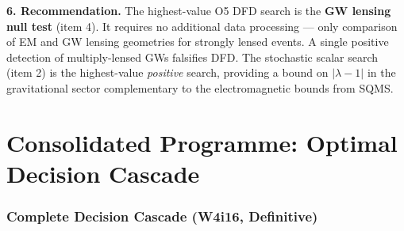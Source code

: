 \documentclass[11pt]{article}
\newcommand{\lbone}{|\lambda - 1|}
\begin{document}
\begin{tcolorbox}[colback=white, colframe=black, breakable,
  title=\textbf{WHITE PAPER: Searching for Scalar Breathing Modes
  in LIGO O5 Data}]
\bigskip

\textbf{6. Recommendation.}
The highest-value O5 DFD search is the \textbf{GW lensing null test}
(item 4). It requires no additional data processing --- only
comparison of EM and GW lensing geometries for strongly lensed events.
A single positive detection of multiply-lensed GWs falsifies DFD.
The stochastic scalar search (item 2) is the highest-value
\emph{positive} search, providing a bound on $\lbone$ in the
gravitational sector complementary to the electromagnetic bounds from
SQMS.

\end{tcolorbox}


\part{Consolidated Programme: Optimal Decision Cascade}
\label{part:programme}

\section{Complete Decision Cascade (W4i16, Definitive)}
\end{document}
